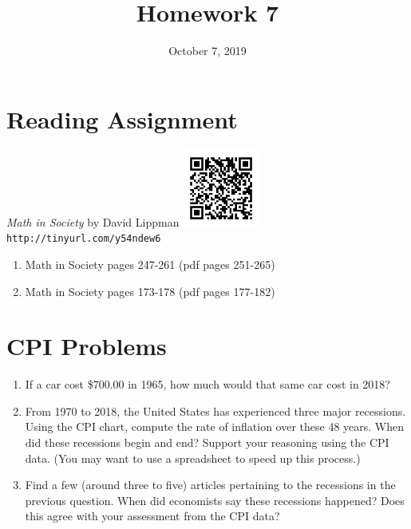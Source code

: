 \documentclass{article}
\title{Homework 7}
\date{October 7, 2019}
\begin{document}
\maketitle

\section*{Reading Assignment}
\begin{center}
    {\em Math in Society} by David Lippman\newline
    \includegraphics[width=1in]{readings/society}\newline
    {\tt http://tinyurl.com/y54ndew6}
\end{center}
\begin{enumerate}
\item Math in Society pages 247-261 (pdf pages 251-265)
\item Math in Society pages 173-178 (pdf pages 177-182)
\end{enumerate}

\section{CPI Problems}
\begin{enumerate}
\item If a car cost \$700.00 in 1965, how much would that same car cost in 2018?
\item From 1970 to 2018, the United States has experienced three major recessions.  
Using the CPI chart, compute the rate of inflation over these 48 years.  When did
these recessions begin and end?  Support your reasoning using the CPI data.  (You 
may want to use a spreadsheet to speed up this process.)
\item Find a few (around three to five) articles pertaining to the recessions in the
previous question. When did economists say these recessions happened?  Does this agree
with your assessment from the CPI data?
\end{enumerate}
\end{document}
